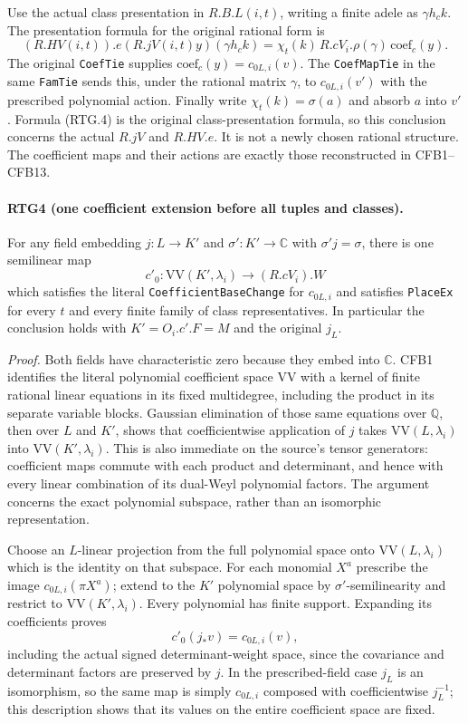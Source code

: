 Use the actual class presentation in $R.B.L(i,t)$, writing a finite
adele as $\gamma h_c k$.  The presentation formula for the original
rational form is
\[
 (R.HV(i,t)).e(R.jV(i,t)y)(\gamma h_c k)
   =\chi_t(k)\,R.cV_i.\rho(\gamma)\,
                       \mathrm{coef}_c(y).                 \tag{RTG.4}
\]
The original \texttt{CoefTie} supplies
$\mathrm{coef}_c(y)=c_{0L,i}(v)$.
The \texttt{CoefMapTie} in the same \texttt{FamTie} sends this, under
the rational matrix $\gamma$, to $c_{0L,i}(v')$ with the prescribed
polynomial action.  Finally write $\chi_t(k)=\sigma(a)$ and absorb
$a$ into $v'$.  Formula (RTG.4) is the original class-presentation
formula, so this conclusion concerns the actual $R.jV$ and $R.HV.e$.
It is not a newly chosen rational structure.  The coefficient maps and
their actions are exactly those reconstructed in CFB1--CFB13.

\paragraph{RTG4 (one coefficient extension before all tuples and classes).}
\label{claim:RTG4}
For any field embedding $j:L\to K'$ and $\sigma':K'\to\mathbb C$
with $\sigma'j=\sigma$, there is one semilinear map
\[
 c'_0:\mathrm{VV}(K',\lambda_i)\longrightarrow (R.cV_i).W
                                                               \tag{RTG.5}
\]
which satisfies the literal \texttt{CoefficientBaseChange} for
$c_{0L,i}$ and satisfies \texttt{PlaceEx} for every $t$ and every
finite family of class representatives.  In particular the conclusion
holds with $K'=O_i.c'.F=M$ and the original $j_L$.

\emph{Proof.}
Both fields have characteristic zero because they embed into $\mathbb C$.
CFB1 identifies the literal polynomial coefficient space $\mathrm{VV}$
with a kernel of finite rational linear equations in its fixed
multidegree, including the product in its separate variable blocks.
Gaussian elimination of those same equations over $\mathbb Q$, then
over $L$ and $K'$, shows that coefficientwise application of $j$
takes $\mathrm{VV}(L,\lambda_i)$ into
$\mathrm{VV}(K',\lambda_i)$.  This is also immediate on the source's
tensor generators: coefficient maps commute with each product and
determinant, and hence with every linear combination of its
dual-Weyl polynomial factors.  The argument concerns the exact
polynomial subspace, rather than an isomorphic representation.

Choose an $L$-linear projection from the full polynomial space onto
$\mathrm{VV}(L,\lambda_i)$ which is the identity on that subspace.
For each monomial $X^a$ prescribe the image
$c_{0L,i}(\pi X^a)$; extend to the $K'$ polynomial space by
$\sigma'$-semilinearity and restrict to $\mathrm{VV}(K',\lambda_i)$.
Every polynomial has finite support.  Expanding its coefficients proves
\[
 c'_0(j_*v)=c_{0L,i}(v),                                    \tag{RTG.6}
\]
including the actual signed determinant-weight space, since the
covariance and determinant factors are preserved by $j$.  In the
prescribed-field case $j_L$ is an isomorphism, so the same map is simply
$c_{0L,i}$ composed with coefficientwise $j_L^{-1}$; this description
shows that its values on the entire coefficient space are fixed.

